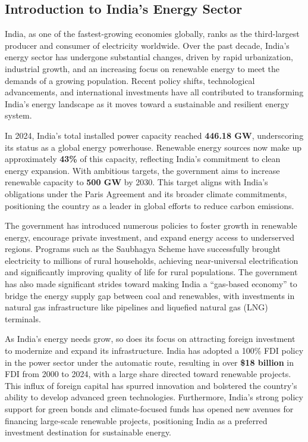 \documentclass[12pt]{article}
\begin{document}
\begin{spacing}{1.5}

\section*{Introduction to India's Energy Sector}
India, as one of the fastest-growing economies globally, ranks as the third-largest producer and consumer of electricity worldwide. Over the past decade, India's energy sector has undergone substantial changes, driven by rapid urbanization, industrial growth, and an increasing focus on renewable energy to meet the demands of a growing population. Recent policy shifts, technological advancements, and international investments have all contributed to transforming India's energy landscape as it moves toward a sustainable and resilient energy system.

In 2024, India’s total installed power capacity reached \textbf{446.18 GW}, underscoring its status as a global energy powerhouse. Renewable energy sources now make up approximately \textbf{43\%} of this capacity, reflecting India's commitment to clean energy expansion. With ambitious targets, the government aims to increase renewable capacity to \textbf{500 GW} by 2030. This target aligns with India's obligations under the Paris Agreement and its broader climate commitments, positioning the country as a leader in global efforts to reduce carbon emissions.

The government has introduced numerous policies to foster growth in renewable energy, encourage private investment, and expand energy access to underserved regions. Programs such as the Saubhagya Scheme have successfully brought electricity to millions of rural households, achieving near-universal electrification and significantly improving quality of life for rural populations. The government has also made significant strides toward making India a “gas-based economy” to bridge the energy supply gap between coal and renewables, with investments in natural gas infrastructure like pipelines and liquefied natural gas (LNG) terminals.

As India’s energy needs grow, so does its focus on attracting foreign investment to modernize and expand its infrastructure. India has adopted a 100\% FDI policy in the power sector under the automatic route, resulting in over \textbf{\$18 billion} in FDI from 2000 to 2024, with a large share directed toward renewable projects. This influx of foreign capital has spurred innovation and bolstered the country's ability to develop advanced green technologies. Furthermore, India’s strong policy support for green bonds and climate-focused funds has opened new avenues for financing large-scale renewable projects, positioning India as a preferred investment destination for sustainable energy.


\end{spacing}
\end{document}
